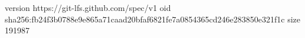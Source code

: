 version https://git-lfs.github.com/spec/v1
oid sha256:fb24f3b0788e9e865a71caad20bfaf6821fe7a0854365cd246e283850e321f1c
size 191987
